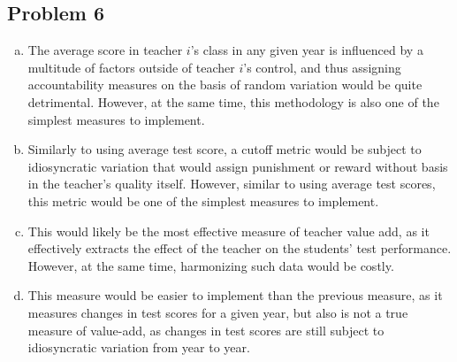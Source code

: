 \documentclass[10pt]{extarticle}
\begin{document}
  \subsection{Problem 6}%
  \begin{enumerate}[(a)]
    \item The average score in teacher $i$'s class in any given year is influenced by a multitude of factors outside of teacher $i$'s control, and thus assigning accountability measures on the basis of random variation would be quite detrimental. However, at the same time, this methodology is also one of the simplest measures to implement.
    \item Similarly to using average test score, a cutoff metric would be subject to idiosyncratic variation that would assign punishment or reward without basis in the teacher's quality itself. However, similar to using average test scores, this metric would be one of the simplest measures to implement.
    \item This would likely be the most effective measure of teacher value add, as it effectively extracts the effect of the teacher on the students' test performance. However, at the same time, harmonizing such data would be costly.
    \item This measure would be easier to implement than the previous measure, as it measures changes in test scores for a given year, but also is not a true measure of value-add, as changes in test scores are still subject to idiosyncratic variation from year to year.
  \end{enumerate}
\end{document}
